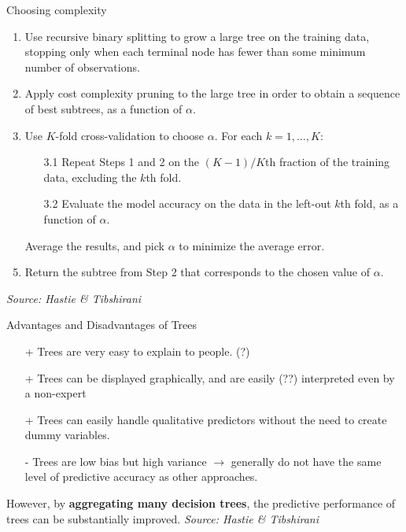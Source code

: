 \documentclass[xcolor=table,aspectratio=169]{beamer}
\begin{document}
\begin{frame}{Choosing complexity}
	\begin{enumerate}
		\item Use recursive binary splitting to grow a large tree on the
		training data, stopping only when each terminal node has
		fewer than some minimum number of observations.
		\item Apply cost complexity pruning to the large tree in order to
		obtain a sequence of best subtrees, as a function of $\alpha$.
		\item Use $K$-fold cross-validation to choose $\alpha$. For each
		$k = 1, \ldots, K$:
		\begin{enumerate}
			\item[3.1]  Repeat Steps 1 and 2 on the $(K−1)/K$th fraction of the training
			data, excluding the $k$th fold.
			\item[3.2] Evaluate the model accuracy on the data in
			the left-out $k$th fold, as a function of $\alpha$.
		\end{enumerate}
		\item[] Average the results, and pick $\alpha$ to minimize the average
		error.
		\item Return the subtree from Step 2 that corresponds to the
		chosen value of $\alpha$.
	\end{enumerate}
	
	\vfill
	{\emph{\color{gray}\footnotesize{Source: Hastie \& Tibshirani}}}
\end{frame}

\begin{frame}
	{Advantages and Disadvantages of Trees}
	\begin{itemize}
		\item[+] Trees are very easy to explain to people. (?)
		\item[+] Trees can be displayed graphically, and are easily (??)
		interpreted even by a non-expert
		\item[+] Trees can easily handle qualitative predictors without the
		need to create dummy variables.
		\item[-] Trees are low bias but high variance $\rightarrow$ generally do not have the same level of
		predictive accuracy as other approaches.
	\end{itemize}
	
	However, by \textbf{aggregating many decision trees}, the predictive
	performance of trees can be substantially improved.
	\vfill
	{\emph{\color{gray}\footnotesize{Source: Hastie \& Tibshirani}}}
\end{frame}
\end{document}
